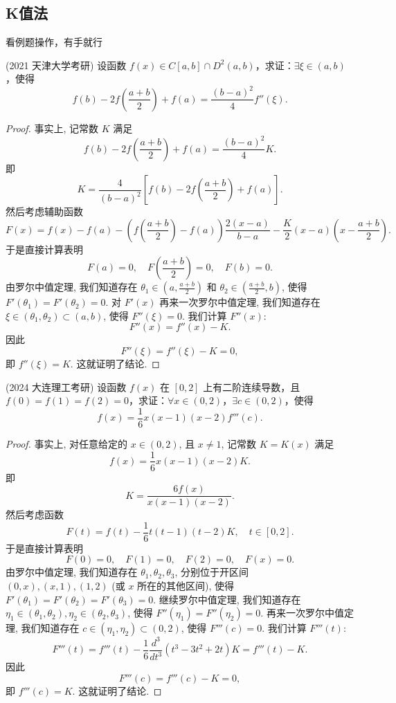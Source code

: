 \documentclass[lang=cn,10pt,thmcnt=section]{elegantbook}
\begin{document}
\subsection{K值法}
看例题操作，有手就行
\begin{example}
	(2021 天津大学考研) 设函数 \( f(x) \in C[a,b] \cap D^2(a,b) \)，求证：\(\exists \xi \in (a,b)\)，使得
\[ f(b) - 2f\left(\frac{a+b}{2}\right) + f(a) = \frac{(b-a)^2}{4}f''(\xi). \]
\end{example}
\begin{proof}
    事实上, 记常数 $K$ 满足
\[
f(b) - 2f\left(\frac{a+b}{2}\right) + f(a) = \frac{(b-a)^2}{4}K.
\]
即
\[
K = \frac{4}{(b-a)^2} \left[ f(b) - 2f\left(\frac{a+b}{2}\right) + f(a) \right].
\]
然后考虑辅助函数
\[
F(x) = f(x) - f(a) - \left( f\left(\frac{a+b}{2}\right) - f(a) \right)\frac{2(x-a)}{b-a} - \frac{K}{2}(x-a)\left(x-\frac{a+b}{2}\right).
\]
于是直接计算表明
\[
F(a) = 0, \quad F\left(\frac{a+b}{2}\right) = 0, \quad F(b) = 0.
\]
由罗尔中值定理, 我们知道存在 $\theta_1 \in \left(a, \frac{a+b}{2}\right)$ 和 $\theta_2 \in \left(\frac{a+b}{2}, b\right)$, 使得 $F'(\theta_1) = F'(\theta_2) = 0$.
对 $F'(x)$ 再来一次罗尔中值定理, 我们知道存在 $\xi \in (\theta_1, \theta_2) \subset (a,b)$, 使得 $F''(\xi)=0$.
我们计算 $F''(x)$:
\[
F''(x) = f''(x) - K.
\]
因此
\[
F''(\xi) = f''(\xi) - K = 0,
\]
即 $f''(\xi) = K$. 这就证明了结论.
\end{proof}
\begin{example}
	(2024 大连理工考研) 设函数 \( f(x) \) 在 \([0,2]\) 上有二阶连续导数，且 \( f(0) = f(1) = f(2) = 0 \)，求证：\(\forall x \in (0,2)\)，\(\exists c \in (0,2)\)，使得
\[ f(x) = \frac{1}{6}x(x-1)(x-2)f'''(c). \]
\end{example}
\begin{proof}
    事实上, 对任意给定的 $x \in (0,2)$, 且 $x \neq 1$, 记常数 $K = K(x)$ 满足
\[
f(x) = \frac{1}{6}x(x-1)(x-2)K.
\]
即
\[
K = \frac{6f(x)}{x(x-1)(x-2)}.
\]
然后考虑函数
\[
F(t) = f(t) - \frac{1}{6}t(t-1)(t-2)K, \quad t \in [0, 2].
\]
于是直接计算表明
\[
F(0) = 0, \quad F(1) = 0, \quad F(2) = 0, \quad F(x) = 0.
\]
由罗尔中值定理, 我们知道存在 $\theta_1, \theta_2, \theta_3$, 分别位于开区间 $(0,x), (x,1), (1,2)$ (或 $x$ 所在的其他区间), 使得 $F'(\theta_1) = F'(\theta_2) = F'(\theta_3) = 0$.
继续罗尔中值定理, 我们知道存在 $\eta_1 \in (\theta_1, \theta_2), \eta_2 \in (\theta_2, \theta_3)$, 使得 $F''(\eta_1) = F''(\eta_2) = 0$.
再来一次罗尔中值定理, 我们知道存在 $c \in (\eta_1, \eta_2) \subset (0,2)$, 使得 $F'''(c) = 0$.
我们计算 $F'''(t)$:
\[
F'''(t) = f'''(t) - \frac{1}{6} \frac{d^3}{dt^3}(t^3 - 3t^2 + 2t)K = f'''(t) - K.
\]
因此
\[
F'''(c) = f'''(c) - K = 0,
\]
即 $f'''(c)=K$. 这就证明了结论.
\end{proof}
\end{document}

